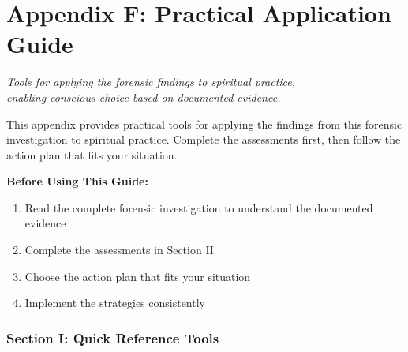 \documentclass[11pt,twoside]{book}
\begin{document}
\part*{Appendix F: Practical Application Guide}
\label{sec:org3abe0a1}

{\centering\itshape Tools for applying the forensic findings to spiritual practice,\\enabling conscious choice based on documented evidence.\par}
\vspace{0.3cm}

\normalfont\justifying
This appendix provides practical tools for applying the findings from this forensic investigation to spiritual practice. Complete the assessments first, then follow the action plan that fits your situation.

\textbf{\textbf{Before Using This Guide:}}
\begin{enumerate}
\item Read the complete forensic investigation to understand the documented evidence
\item Complete the assessments in Section II
\item Choose the action plan that fits your situation
\item Implement the strategies consistently
\end{enumerate}
\section*{Section I: Quick Reference Tools}
\label{sec:orgee2428f}
\end{document}
